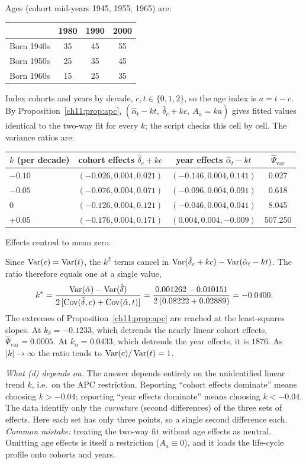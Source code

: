 \documentclass[../solutions_manual.tex]{subfiles}
\begin{document}
 Ages (cohort mid-years 1945, 1955, 1965) are:
\begin{center}
\begin{tabular}{lccc}
\toprule
& 1980 & 1990 & 2000 \\
\midrule
Born 1940s & 35 & 45 & 55 \\
Born 1950s & 25 & 35 & 45 \\
Born 1960s & 15 & 25 & 35 \\
\bottomrule
\end{tabular}
\end{center}
Index cohorts and years by decade, $c, t \in \{0, 1, 2\}$, so the age index is $a = t - c$. By Proposition~\ref{ch11:prop:apc}, $(\hat\alpha_t - kt,\ \hat\delta_c + kc,\ A_a = ka)$ gives fitted values identical to the two-way fit for every $k$; the script checks this cell by cell. The variance ratios are:
\begin{center}
\begin{tabular}{lccc}
\toprule
$k$ (per decade) & cohort effects $\hat\delta_c + kc$ & year effects $\hat\alpha_t - kt$ & $\hat\Psi_{\text{var}}$ \\
\midrule
$-0.10$ & $(-0.026, 0.004, 0.021)$ & $(-0.146, 0.004, 0.141)$ & 0.027 \\
$-0.05$ & $(-0.076, 0.004, 0.071)$ & $(-0.096, 0.004, 0.091)$ & 0.618 \\
$0$ & $(-0.126, 0.004, 0.121)$ & $(-0.046, 0.004, 0.041)$ & 8.045 \\
$+0.05$ & $(-0.176, 0.004, 0.171)$ & $(0.004, 0.004, -0.009)$ & 507.250 \\
\bottomrule
\end{tabular}

{\small Effects centred to mean zero.}
\end{center}
Since $\operatorname{Var}(c) = \operatorname{Var}(t)$, the $k^2$ terms cancel in $\operatorname{Var}(\hat\delta_c + kc) - \operatorname{Var}(\hat\alpha_t - kt)$. The ratio therefore equals one at a single value,
\[
k^* = \frac{\operatorname{Var}(\hat\alpha) - \operatorname{Var}(\hat\delta)}{2\,[\operatorname{Cov}(\hat\delta, c) + \operatorname{Cov}(\hat\alpha, t)]} = \frac{0.001262 - 0.010151}{2\,(0.08222 + 0.02889)} = -0.0400 .
\]
The extremes of Proposition~\ref{ch11:prop:apc} are reached at the least-squares slopes. At $k_\delta = -0.1233$, which detrends the nearly linear cohort effects, $\hat\Psi_{\text{var}} = 0.0005$. At $k_\alpha = 0.0433$, which detrends the year effects, it is $1876$. As $|k| \to \infty$ the ratio tends to $\operatorname{Var}(c)/\operatorname{Var}(t) = 1$.

\textit{What (d) depends on.} The answer depends entirely on the unidentified linear trend $k$, i.e.\ on the APC restriction. Reporting ``cohort effects dominate'' means choosing $k > -0.04$; reporting ``year effects dominate'' means choosing $k < -0.04$. The data identify only the \emph{curvature} (second differences) of the three sets of effects. Here each set has only three points, so a single second difference each. \textit{Common mistake:} treating the two-way fit without age effects as neutral. Omitting age effects is itself a restriction ($A_a \equiv 0$), and it loads the life-cycle profile onto cohorts and years.
\end{document}
